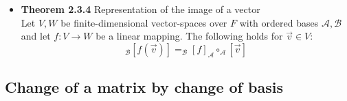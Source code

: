 \documentclass[11pt,a4paper]{article}
\begin{document}
\begin{itemize}
    \item \textbf{Theorem 2.3.4} Representation of the image of a vector \\
        Let $V,W$ be finite-dimensional vector-spaces over $F$ with ordered bases
        $\mathcal{A,B}$ and let $f : V \to W$ be a linear mapping.
        The following holds for $\vec{v} \in V$:
        \[
            _\mathcal{B}{[f(\vec{v})]} = _\mathcal{B}{[f]}_\mathcal{A} \circ
            _\mathcal{A}[\vec{v}]
        \]

\end{itemize}

\subsection{Change of a matrix by change of basis}
\end{document}
